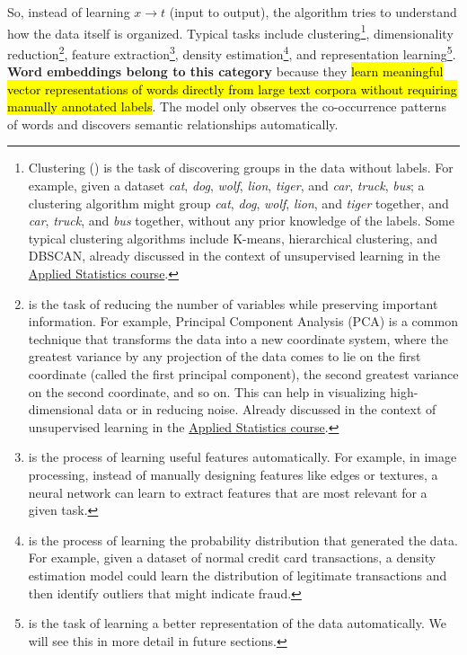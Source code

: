 \begin{itemize}
    \highspace
    So, instead of learning $x \to t$ (input to output), the algorithm tries to understand how the data itself is organized. Typical tasks include clustering\footnote{%
        Clustering () is the task of discovering groups in the data without labels. For example, given a dataset \emph{cat}, \emph{dog}, \emph{wolf}, \emph{lion}, \emph{tiger}, and \emph{car}, \emph{truck}, \emph{bus}; a clustering algorithm might group \emph{cat}, \emph{dog}, \emph{wolf}, \emph{lion}, and \emph{tiger} together, and \emph{car}, \emph{truck}, and \emph{bus} together, without any prior knowledge of the labels. Some typical clustering algorithms include K-means, hierarchical clustering, and DBSCAN, already discussed in the context of unsupervised learning in the \href{https://polimi-hpc-e-notes-projects-andrevale69.github.io/HPC-E-PoliMI-university-notes/applied-statistics/notes/applied-statistics.pdf}{Applied Statistics course}.
    }, dimensionality reduction\footnote{%
         is the task of reducing the number of variables while preserving important information. For example, Principal Component Analysis (PCA) is a common technique that transforms the data into a new coordinate system, where the greatest variance by any projection of the data comes to lie on the first coordinate (called the first principal component), the second greatest variance on the second coordinate, and so on. This can help in visualizing high-dimensional data or in reducing noise. Already discussed in the context of unsupervised learning in the \href{https://polimi-hpc-e-notes-projects-andrevale69.github.io/HPC-E-PoliMI-university-notes/applied-statistics/notes/applied-statistics.pdf}{Applied Statistics course}.
    }, feature extraction\footnote{%
         is the process of learning useful features automatically. For example, in image processing, instead of manually designing features like edges or textures, a neural network can learn to extract features that are most relevant for a given task.
    }, density estimation\footnote{%
         is the process of learning the probability distribution that generated the data. For example, given a dataset of normal credit card transactions, a density estimation model could learn the distribution of legitimate transactions and then identify outliers that might indicate fraud.
    }, and representation learning\footnote{%
         is the task of learning a better representation of the data automatically. We will see this in more detail in future sections.
    }. \textbf{Word embeddings belong to this category} because they \hl{learn meaningful vector representations of words directly from large text corpora without requiring manually annotated labels}. The model only observes the co-occurrence patterns of words and discovers semantic relationships automatically.


\end{itemize}
